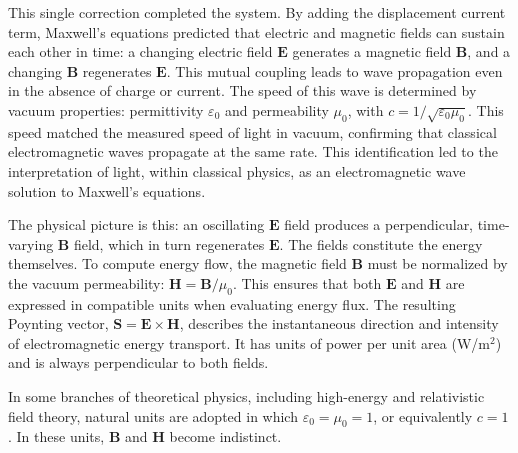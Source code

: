This single correction completed the system. By adding the displacement current term, Maxwell’s equations predicted that electric and magnetic fields can sustain each other in time: a changing electric field $\mathbf{E}$ generates a magnetic field $\mathbf{B}$, and a changing $\mathbf{B}$ regenerates $\mathbf{E}$. This mutual coupling leads to wave propagation even in the absence of charge or current. The speed of this wave is determined by vacuum properties: permittivity $\varepsilon_0$ and permeability $\mu_0$, with $c = 1/\sqrt{\varepsilon_0 \mu_0}$. This speed matched the measured speed of light in vacuum, confirming that classical electromagnetic waves propagate at the same rate. This identification led to the interpretation of light, within classical physics, as an electromagnetic wave solution to Maxwell’s equations.

The physical picture is this: an oscillating $\mathbf{E}$ field produces a perpendicular, time-varying $\mathbf{B}$ field, which in turn regenerates $\mathbf{E}$. The fields constitute the energy themselves. To compute energy flow, the magnetic field $\mathbf{B}$ must be normalized by the vacuum permeability: $\mathbf{H} = \mathbf{B} / \mu_0$. This ensures that both $\mathbf{E}$ and $\mathbf{H}$ are expressed in compatible units when evaluating energy flux. The resulting Poynting vector, $\mathbf{S} = \mathbf{E} \times \mathbf{H}$, describes the instantaneous direction and intensity of electromagnetic energy transport. It has units of power per unit area (W/m$^2$) and is always perpendicular to both fields.

In some branches of theoretical physics, including high-energy and relativistic field theory, natural units are adopted in which $\varepsilon_0 = \mu_0 = 1$, or equivalently $c = 1$. In these units, $\mathbf{B}$ and $\mathbf{H}$ become indistinct.

